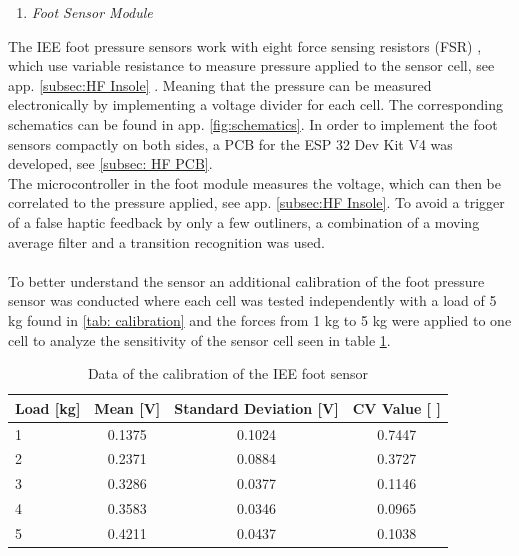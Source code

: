 \documentclass[conference,a4paper]{IEEEtran}
\begin{document}
\begin{enumerate}[\textit{2)}]
    \item{\textit{Foot Sensor Module}}
\end{enumerate}


The IEE foot pressure sensors work with eight force sensing resistors (FSR) \cite{Footsensor}, which use variable resistance to measure pressure applied to the sensor cell, see app. \ref{subsec:HF Insole} . Meaning that the pressure can be measured electronically by implementing a voltage divider for each cell. The corresponding schematics can be found in app. \ref{fig:schematics}. In order to implement the foot sensors compactly on both sides, a PCB for the ESP 32 Dev Kit V4 was developed, see \ref{subsec: HF PCB}. \\
The microcontroller in the foot module measures the voltage, which can then be correlated to the pressure applied, see app. \ref{subsec:HF Insole}. To avoid a trigger of a false haptic feedback by only a few outliners, a combination of a moving average filter and a transition recognition was used.\\
\\
To better understand the sensor an additional calibration of the foot pressure sensor was conducted where each cell was tested independently with a load of 5 kg found in \ref{tab: calibration} and the forces from 1 kg to 5 kg were applied to one cell to analyze the sensitivity of the sensor cell seen in table \ref{tab:footsensor}.\\ 
\begin{table}[!t]
	\renewcommand{\arraystretch}{1.3}
	\caption{Data of the calibration of the IEE foot sensor}
	\label{tab:footsensor}
	\centering
		\begin{tabular}{l|ccc}
			\hline
			Load [kg] & Mean [V] & Standard Deviation [V] & CV Value [ ]\\ \hline 
			1  & 0.1375 & 0.1024 & 0.7447 \\
			2  & 0.2371 & 0.0884 & 0.3727 \\
		    3 & 0.3286 & 0.0377 &  0.1146 \\
			4 & 0.3583 & 0.0346 & 0.0965 \\
			5 & 0.4211 & 0.0437 & 0.1038 \\
			\hline
		\end{tabular}
\end{table}
\end{document}
